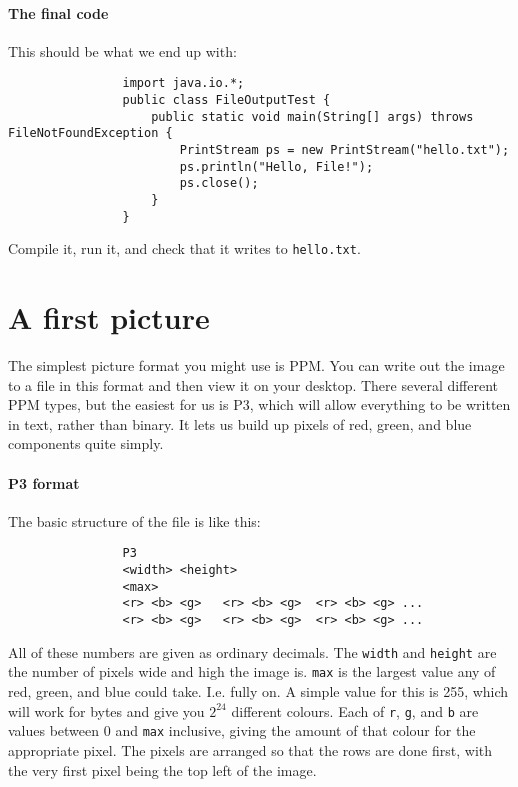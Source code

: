 \documentclass{article}
\begin{document}
        \paragraph{The final code}
            This should be what we end up with:
            
            \begin{verbatim}
                import java.io.*;
                public class FileOutputTest {
                    public static void main(String[] args) throws FileNotFoundException {
                        PrintStream ps = new PrintStream("hello.txt");
                        ps.println("Hello, File!");
                        ps.close();
                    }
                }
            \end{verbatim}
        
            Compile it, run it, and check that it writes to \texttt{hello.txt}.

    \section{A first picture}
     
        The simplest picture format you might use is PPM. You can write out the image to a file in this format and then view it on your
        desktop. There several different PPM types, but the easiest for us is P3, which will allow everything to be written in text, rather
        than binary. It lets us build up pixels of red, green, and blue components quite simply.
        
        \paragraph{P3 format}
            The basic structure of the file is like this:
        
            \begin{verbatim}
                P3
                <width> <height>
                <max>
                <r> <b> <g>   <r> <b> <g>  <r> <b> <g> ...
                <r> <b> <g>   <r> <b> <g>  <r> <b> <g> ...            
            \end{verbatim}

            All of these numbers are given as ordinary decimals. The \texttt{width} and \texttt{height} are the number of pixels wide and
            high the image is. \texttt{max} is the largest value any of red, green, and blue could take. I.e. fully on. A simple value for
            this is 255, which will work for bytes and give you $2^24$ different colours. Each of \texttt{r}, \texttt{g}, and \texttt{b}
            are values between 0 and \texttt{max} inclusive, giving the amount of that colour for the appropriate pixel. The pixels are
            arranged so that the rows are done first, with the very first pixel being the top left of the image.
        
\end{document}
